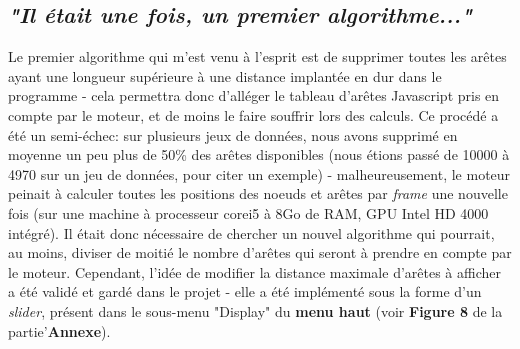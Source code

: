 \documentclass[12pt]{report}
\begin{document}
\begin{spacing}{1.2}
\subsection{\textit{"Il était une fois, un premier algorithme..."}}
Le premier algorithme qui m'est venu à l'esprit est de supprimer toutes les arêtes ayant une longueur supérieure à une distance implantée en dur dans le programme - cela permettra donc d'alléger le tableau d'arêtes Javascript pris en compte par le moteur, et de moins le faire souffrir lors des calculs.
\newline
Ce procédé a été un semi-échec: sur plusieurs jeux de données, nous avons supprimé en moyenne un peu plus de 50\% des arêtes disponibles (nous étions passé de 10000 à 4970 sur un jeu de données, pour citer un exemple) - malheureusement, le moteur peinait à calculer toutes les positions des noeuds et arêtes par \textit{frame} une nouvelle fois (sur une machine à processeur corei5 à 8Go de RAM, GPU Intel HD 4000 intégré).
\newline
Il était donc nécessaire de chercher un nouvel algorithme qui pourrait, au moins, diviser de moitié le nombre d'arêtes qui seront à prendre en compte par le moteur. Cependant, l'idée de modifier la distance maximale d'arêtes à afficher a été validé et gardé dans le projet - elle a été implémenté sous la forme d'un \textit{slider}, présent dans le sous-menu "Display" du \textbf{menu haut} (voir \textbf{Figure 8} de la partie'\textbf{Annexe}).


\end{spacing}
\end{document}

